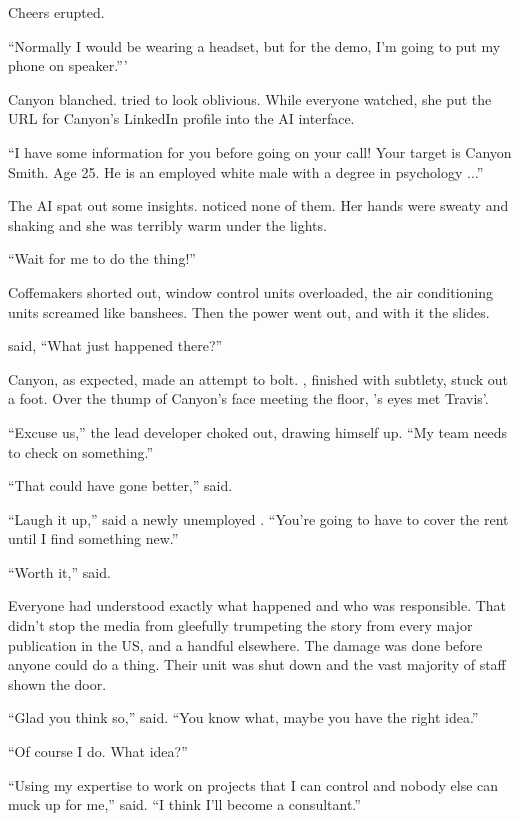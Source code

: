 Cheers erupted.

``Normally I would be wearing a headset, but for the demo, I'm going to put my phone on speaker.'''

Canyon blanched. {\protag} tried to look oblivious. While everyone watched, she put the URL for Canyon's LinkedIn profile into the AI interface.

``I have some information for you before going on your call! Your target is Canyon Smith. Age 25. He is an employed white male with a degree in psychology ...''

The AI spat out some insights. {\protag} noticed none of them. Her hands were sweaty and shaking and she was terribly warm under the lights.

``Wait for me to do the thing!''

Coffemakers shorted out, window control units overloaded, the air conditioning units screamed like banshees. Then the power went out, and with it the slides.

{\protag} said, ``What just happened there?''

Canyon, as expected, made an attempt to bolt. {\protag}, finished with subtlety, stuck out a foot. Over the thump of Canyon's face meeting the floor, {\protag}'s eyes met Travis'.

``Excuse us,'' the lead developer choked out, drawing himself up. ``My team needs to check on something.''

\vspace{5mm}

``That could have gone better,'' {\sidetag} said.

``Laugh it up,'' said a newly unemployed {\protag}. ``You're going to have to cover the rent until I find something new.''

``Worth it,'' {\sidetag} said.

Everyone had understood exactly what happened and who was responsible. That didn't stop the media from gleefully trumpeting the story from every major publication in the US, and a handful elsewhere. The damage was done before anyone could do a thing. Their unit was shut down and the vast majority of staff shown the door.

``Glad you think so,'' {\protag} said. ``You know what, maybe you have the right idea.''

``Of course I do. What idea?''

``Using my expertise to work on projects that I can control and nobody else can muck up for me,'' {\protag} said. ``I think I'll become a consultant.''

